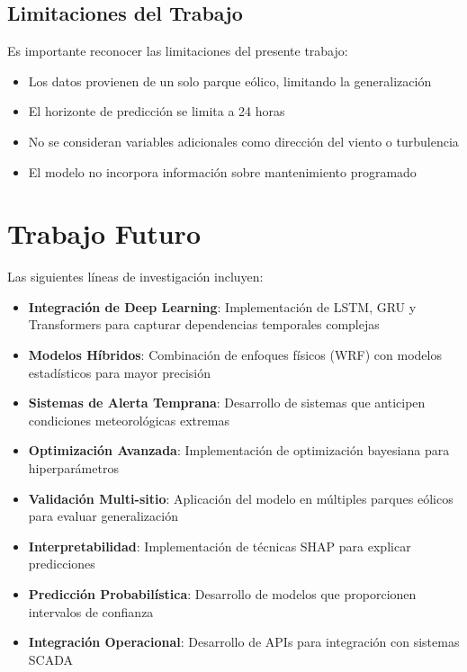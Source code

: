 \documentclass[conference]{IEEEtran}
\begin{document}
	\subsection{Limitaciones del Trabajo}
	Es importante reconocer las limitaciones del presente trabajo:
	\begin{itemize}
		\item Los datos provienen de un solo parque eólico, limitando la generalización
		\item El horizonte de predicción se limita a 24 horas
		\item No se consideran variables adicionales como dirección del viento o turbulencia
		\item El modelo no incorpora información sobre mantenimiento programado
	\end{itemize}
	
	\section{Trabajo Futuro}
	
	Las siguientes líneas de investigación incluyen:
	\begin{itemize}
		\item \textbf{Integración de Deep Learning}: Implementación de LSTM, GRU y Transformers para capturar dependencias temporales complejas
		\item \textbf{Modelos Híbridos}: Combinación de enfoques físicos (WRF) con modelos estadísticos para mayor precisión
		\item \textbf{Sistemas de Alerta Temprana}: Desarrollo de sistemas que anticipen condiciones meteorológicas extremas
		\item \textbf{Optimización Avanzada}: Implementación de optimización bayesiana para hiperparámetros
		\item \textbf{Validación Multi-sitio}: Aplicación del modelo en múltiples parques eólicos para evaluar generalización
		\item \textbf{Interpretabilidad}: Implementación de técnicas SHAP para explicar predicciones
		\item \textbf{Predicción Probabilística}: Desarrollo de modelos que proporcionen intervalos de confianza
		\item \textbf{Integración Operacional}: Desarrollo de APIs para integración con sistemas SCADA
	\end{itemize}
	
\end{document}
